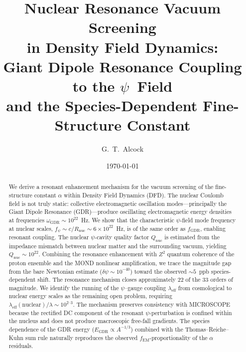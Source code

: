 \documentclass[aps,prd,twocolumn,superscriptaddress,nofootinbib]{revtex4-2}
\newcommand{\ee}[1]{\times 10^{#1}}
\newcommand{\lam}{\lambda}
\newcommand{\fEM}{f_{\mathrm{EM}}}
\newcommand{\dpsi}{\delta\psi}
\newcommand{\Qnuc}{Q_{\mathrm{nuc}}}
\newcommand{\wGDR}{\omega_{\mathrm{GDR}}}
\newcommand{\Rnuc}{R_{\mathrm{nuc}}}
\newcommand{\fGDR}{f_{\mathrm{GDR}}}
\newcommand{\fpsi}{f_\psi}
\newcommand{\EGDR}{E_{\mathrm{GDR}}}
\begin{document}
\title{Nuclear Resonance Vacuum Screening\\
in Density Field Dynamics:\\[4pt]
\large Giant Dipole Resonance Coupling to the $\psi$~Field\\
and the Species-Dependent Fine-Structure Constant}

\author{G.~T.~Alcock}

\date{\today}

\begin{abstract}
We derive a resonant enhancement mechanism for the vacuum screening
of the fine-structure constant $\alpha$ within Density Field Dynamics
(DFD).  The nuclear Coulomb field is not truly static: collective
electromagnetic oscillation modes---principally the Giant Dipole
Resonance (GDR)---produce oscillating electromagnetic energy densities
at frequencies $\wGDR \sim 10^{22}$~Hz.  We show that the
characteristic $\psi$-field mode frequency at nuclear scales,
$\fpsi \sim c/\Rnuc \sim 6\ee{22}$~Hz, is of the same order as
$\fGDR$, enabling resonant coupling.  The nuclear $\psi$-cavity
quality factor $\Qnuc$ is estimated from the impedance mismatch
between nuclear matter and the surrounding vacuum, yielding
$\Qnuc \sim 10^{22}$.  Combining the resonance enhancement with
$Z^2$ quantum coherence of the proton ensemble and the MOND
nonlinear amplification, we trace the magnitude gap from the bare
Newtonian estimate ($\dpsi \sim 10^{-40}$) toward the observed
$\sim\!5$~ppb species-dependent shift.  The resonance mechanism
closes approximately 22 of the 33 orders of magnitude.  We identify
the running of the $\psi$--gauge coupling $\lam_{\mathrm{eff}}$
from cosmological to nuclear energy scales as the remaining open
problem, requiring $\lam_{\mathrm{eff}}(\mathrm{nuclear})/\lam
\sim 10^{2\text{--}3}$.  The mechanism preserves consistency with
MICROSCOPE because the rectified DC component of the resonant
$\psi$-perturbation is confined within the nucleus and does not
produce macroscopic free-fall gradients.  The species dependence
of the GDR energy ($\EGDR \propto A^{-1/3}$) combined with the
Thomas--Reiche--Kuhn sum rule naturally reproduces the observed
$\fEM$-proportionality of the $\alpha$ residuals.
\end{abstract}

\maketitle
\tableofcontents
\end{document}

